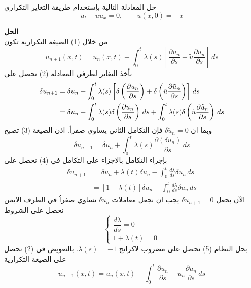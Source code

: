 \begin{example}
	حل المعادلة التالية بإستخدام طريقة التغاير التكراري
	\[
	u_t + u u_x = 0 , \qquad u(x, 0) = -x
 	\]
\end{example}
\noindent
\textbf{الحل}\\
\noindent
من خلال (1) الصيغة التكرارية تكون 
\begin{equation}
u_{n+1}(x, t) = u_n(x, t) + \int_{0}^{t} \lambda(s) \left[\frac{\partial u_n}{\partial s} + \tilde{u}  \frac{\partial \tilde{u}_n}{\partial s}\right] \, ds 
\end{equation}
بأخذ التغاير لطرفي المعادلة (2) نحصل على
\begin{align}
	\delta u_{n+1} &= \delta u_n + \int_{0}^{t} \lambda(s) \left[\delta\left(\frac{\partial u_n}{\partial s}\right) + \delta \left(\tilde{u}  \frac{\partial \tilde{u}_n}{\partial s}\right)\right]\, ds\notag\\
	&= \delta u_n + \int_{0}^t \lambda(s) \delta\left(\frac{\partial u_n}{\partial s}\right) \, ds + \int_{0}^{t} \lambda(s) \delta \left(\tilde{u}  \frac{\partial \tilde{u}_n}{\partial s}\right) \, ds
\end{align}
وبما ان $\delta\tilde{u}_n = 0$ فإن التكامل الثاني يساوي صفراً. اذن الصيغة (3) تصبح 
\begin{equation}
	\delta u_{n+1} = \delta u_n + \int_{0}^{t} \lambda(s) \frac{\partial(\delta u_n)}{\partial s} \, ds
\end{equation} 
بإجراء التكامل بالاجزاء على التكامل في (4) نحصل على
\begin{align*}
	\delta u_{n+1} &= \delta u_n + \lambda(t) \delta u_n - \int_0^t \frac{d \lambda}{ds} \delta u_n \, ds\\
	&= [1 + \lambda(t)] \delta u_n - \int_0^t \frac{d \lambda}{ds} \delta u_n \, ds
\end{align*}
الآن بجعل $\delta u_{n+1} = 0$ يجب ان نجعل معاملات $\delta u_n$ تساوي صفراُ في الطرف الايمن نحصل على الشروط
\begin{equation}
	\begin{cases}
	\dfrac{d \lambda}{ds} = 0 \\
	1 + \lambda(t) = 0
\end{cases}
\end{equation}
بحل النظام (5) نحصل على مضروب لاكرانج $\lambda(s) = -1$. بالتعويض في (2) نحصل على الصيغة التكرارية 
\begin{equation}
	u_{n+1}(x, t) = u_n(x, t) - \int_{0}^{t} \frac{\partial u_n}{\partial s} + {u}_n  \frac{\partial {u}_n}{\partial s}\, ds 
\end{equation}
